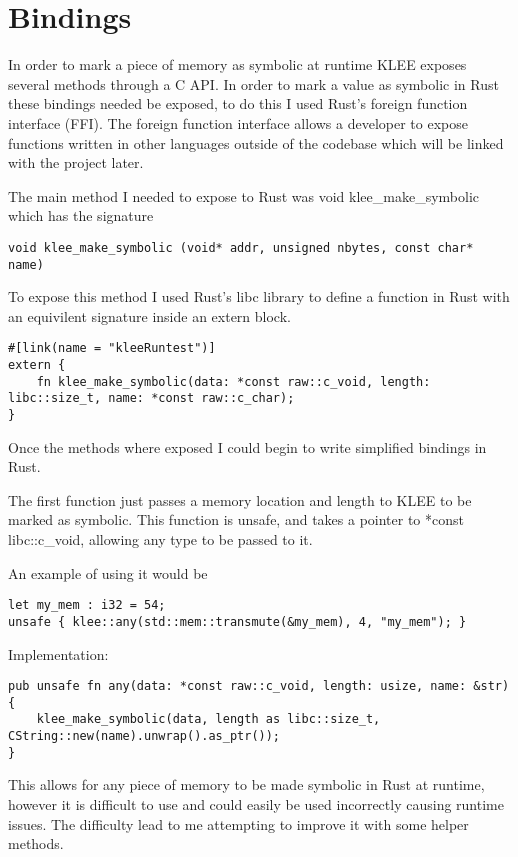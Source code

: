 \documentclass{report}
\begin{document}
\chapter {Bindings}

In order to mark a piece of memory as symbolic at runtime KLEE exposes several methods through a C API. In order to mark a value as symbolic in Rust these bindings needed be exposed, to do this I used Rust's foreign function interface (FFI). The foreign function interface allows a developer to expose functions written in other languages outside of the codebase which will be linked with the project later.

The main method I needed to expose to Rust was void klee_make_symbolic which has the signature
\begin{lstlisting}
void klee_make_symbolic	(void* addr, unsigned nbytes, const char* name)
\end{lstlisting}

To expose this method I used Rust's libc library to define a function in Rust with an equivilent signature inside an extern block.

\begin{lstlisting}
#[link(name = "kleeRuntest")]
extern {
    fn klee_make_symbolic(data: *const raw::c_void, length: libc::size_t, name: *const raw::c_char);
}
\end{lstlisting}

Once the methods where exposed I could begin to write simplified bindings in Rust.

The first function just passes a memory location and length to KLEE to be marked as symbolic. This function is unsafe, and takes a pointer to *const libc::c_void, allowing any type to be passed to it.

An example of using it would be
\begin {lstlisting}
let my_mem : i32 = 54;
unsafe { klee::any(std::mem::transmute(&my_mem), 4, "my_mem"); }
\end{lstlisting}

Implementation:
\begin {lstlisting}
pub unsafe fn any(data: *const raw::c_void, length: usize, name: &str) {
    klee_make_symbolic(data, length as libc::size_t, CString::new(name).unwrap().as_ptr());
}
\end{lstlisting}

This allows for any piece of memory to be made symbolic in Rust at runtime, however it is difficult to use and could easily be used incorrectly causing runtime issues. The difficulty lead to me attempting to improve it with some helper methods.
\end{document}
